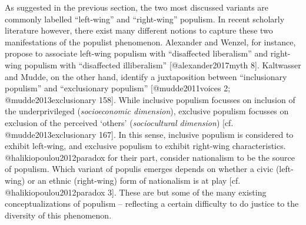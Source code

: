\documentclass[]{article}
\begin{document}
As suggested in the previous section, the two most discussed variants
are commonly labelled ``left-wing'' and ``right-wing'' populism. In
recent scholarly literature however, there exist many different notions
to capture these two manifestations of the populist phenomenon.
Alexander and Wenzel, for instance, propose to associate left-wing
populism with ``disaffected liberalism'' and right-wing populism with
``disaffected illiberalism'' {[}@alexander2017myth 8{]}. Kaltwasser and
Mudde, on the other hand, identify a juxtaposition between
``inclusionary populism'' and ``exclusionary populism''
{[}@mudde2011voices 2; @mudde2013exclusionary 158{]}. While inclusive
populism focusses on inclusion of the underprivileged
(\emph{socioeconomic dimension}), exclusive populism focusses on
exclusion of the perceived `others' (\emph{sociocultural dimension})
{[}cf. @mudde2013exclusionary 167{]}. In this sense, inclusive populism
is considered to exhibit left-wing, and exclusive populism to exhibit
right-wing characteristics. @halikiopoulou2012paradox for their part,
consider nationalism to be the source of populism. Which variant of
populis emerges depends on whether a civic (left-wing) or an ethnic
(right-wing) form of nationalism is at play {[}cf.
@halikiopoulou2012paradox 3{]}. These are but some of the many existing
conceptualizations of populism -- reflecting a certain difficulty to do
justice to the diversity of this phenomenon.
\end{document}
